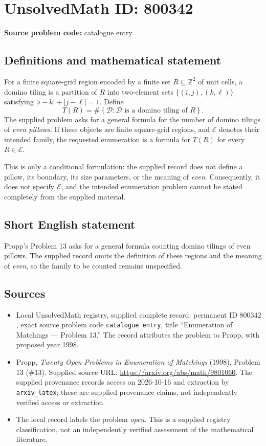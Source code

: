 \documentclass[11pt]{article}
\newcommand{\Z}{\mathbb{Z}}
\begin{document}
\section*{UnsolvedMath ID: 800342}
\textbf{Source problem code:} catalogue entry
\subsection{Definitions and mathematical statement}
For a finite square-grid region encoded by a finite set \(R\subseteq\Z^2\) of unit cells, a domino tiling is a partition of \(R\) into two-element sets \(\{(i,j),(k,\ell)\}\) satisfying \(|i-k|+|j-\ell|=1\). Define
\[
T(R)=\#\left\{\mathcal D:\mathcal D\text{ is a domino tiling of }R\right\}.
\]
The supplied problem asks for a general formula for the number of domino tilings of \emph{even pillows}. If these objects are finite square-grid regions, and \(\mathcal E\) denotes their intended family, the requested enumeration is a formula for \(T(R)\) for every \(R\in\mathcal E\).

This is only a conditional formulation: the supplied record does not define a pillow, its boundary, its size parameters, or the meaning of \emph{even}. Consequently, it does not specify \(\mathcal E\), and the intended enumeration problem cannot be stated completely from the supplied material.
\subsection{Short English statement}
Propp's Problem 13 asks for a general formula counting domino tilings of even pillows. The supplied record omits the definition of these regions and the meaning of \emph{even}, so the family to be counted remains unspecified.
\subsection{Sources}
\begin{itemize}
\item Local UnsolvedMath registry, supplied complete record: permanent ID \(800342\), exact source problem code \texttt{catalogue entry}, title ``Enumeration of Matchings — Problem 13.'' The record attributes the problem to Propp, with proposed year 1998.
\item Propp, \emph{Twenty Open Problems in Enumeration of Matchings} (1998), Problem 13 (\#13). Supplied source URL: \url{https://arxiv.org/abs/math/9801060}. The supplied provenance records access on 2026-10-16 and extraction by \texttt{arxiv\_latex}; these are supplied provenance claims, not independently verified access or extraction.
\item The local record labels the problem \emph{open}. This is a supplied registry classification, not an independently verified assessment of the mathematical literature.
\end{itemize}
\end{document}
